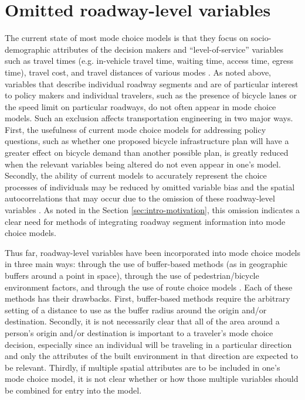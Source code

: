 \section{Omitted roadway-level variables}
\label{sec:omitted_vars}
The current state of most mode choice models is that they focus on socio-demographic attributes of the decision makers and ``level-of-service'' variables such as travel times (e.g. in-vehicle travel time, waiting time, access time, egress time), travel cost, and travel distances of various modes \citep{singleton_pedestrians_2013}. As noted above, variables that describe individual roadway segments and are of particular interest to policy makers and individual travelers, such as the presence of bicycle lanes or the speed limit on particular roadways, do not often appear in mode choice models. Such an exclusion affects transportation engineering in two major ways. First, the usefulness of current mode choice models for addressing policy questions, such as whether one proposed bicycle infrastructure plan will have a greater effect on bicycle demand than another possible plan, is greatly reduced when the relevant variables being altered do not even appear in one's model. Secondly, the ability of current models to accurately represent the choice processes of individuals may be reduced by omitted variable bias and the spatial autocorrelations that may occur due to the omission of these roadway-level variables \citep{goetzke_are_2003}. As noted in the Section \ref{sec:intro-motivation}, this omission indicates a clear need for methods of integrating roadway segment information into mode choice models.

Thus far, roadway-level variables have been incorporated into mode choice models in three main ways: through the use of buffer-based methods (as in geographic buffers around a point in space), through the use of pedestrian/bicycle environment factors, and through the use of route choice models \citep{guo_effect_2007, replogle_integrating_1995, nassir_choice_2014}. Each of these methods has their drawbacks. First, buffer-based methods require the arbitrary setting of a distance to use as the buffer radius around the origin and/or destination. Secondly, it is not necessarily clear that all of the area around a person's origin and/or destination is important to a traveler's mode choice decision, especially since an individual will be traveling in a particular direction and only the attributes of the built environment in that direction are expected to be relevant. Thirdly, if multiple spatial attributes are to be included in one's mode choice model, it is not clear whether or how those multiple variables should be combined for entry into the model. 

